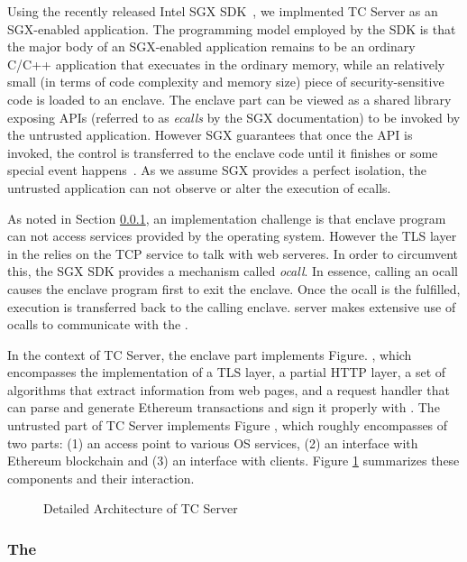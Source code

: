 

Using the recently released Intel SGX SDK~\cite{sgxsdk}, we implmented TC Server
as an SGX-enabled application. The programming model employed by the SDK is 
that the major body of an SGX-enabled
application remains to be an ordinary C/C++ application that execuates in the
ordinary memory, while an relatively small (in terms of code complexity and
memory size) piece of security-sensitive code is loaded to an enclave. 
The enclave part can be
viewed as a shared library exposing APIs (referred to as \emph{ecalls} by the
SGX documentation) to be invoked by the untrusted application. However SGX
guarantees that once the API is invoked, the control is transferred to the 
enclave code until it finishes or some special event happens~\cite{sgxmanual}.
As we assume SGX provides a perfect isolation, the untrusted application can not
observe or alter the execution of ecalls.

As noted in Section \ref{}, an implementation challenge is that enclave program
can not access services provided by the operating system.  However the TLS layer
in the \encname relies on the TCP service to talk with web serveres. In order to
circumvent this, the SGX SDK provides a mechanism called \emph{ocall}. In
essence, calling an ocall causes the enclave program first to exit the enclave.
Once the ocall is the fulfilled, execution is transferred back to the calling
enclave.  \tc server makes extensive use of ocalls to communicate with the
\medname. 

In the context of TC Server, the enclave part implements Figure. , which encompasses the implementation of a TLS layer, a partial HTTP
layer, a set of algorithms that extract information from web pages, and a
request handler that can parse and generate Ethereum transactions and sign it
properly with \skTC.  The untrusted part of TC Server implements Figure , which roughly encompasses of two parts: (1) an access point to various
OS services, (2) an interface with Ethereum blockchain and (3) an interface with
clients. Figure \ref{fig:tcserver_impl} summarizes these components and their
interaction.

\begin{figure}[h]
    \centering
    \caption{Detailed Architecture of TC Server}
    \label{fig:tcserver_impl}
\end{figure}

\subsubsection{The \medname}

